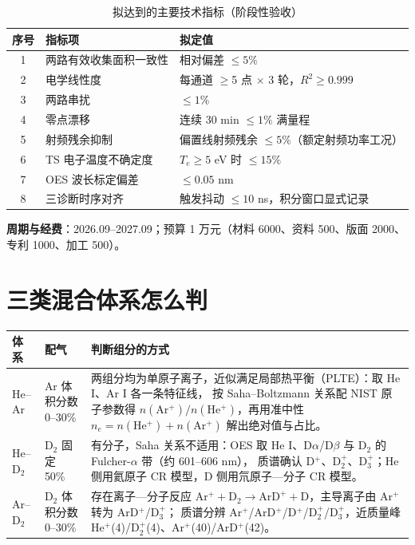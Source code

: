 \documentclass[11pt,a4paper]{ctexart}
\begin{document}
\begin{table}[h]
\centering\small
\caption{拟达到的主要技术指标（阶段性验收）}
\begin{tabular}{@{}cll@{}}
\toprule
序号 & 指标项 & 拟定值 \\
\midrule
1 & 两路有效收集面积一致性 & 相对偏差 $\le 5\%$ \\
2 & 电学线性度 & 每通道 $\ge$5 点 $\times$ 3 轮，$R^2\ge 0.999$ \\
3 & 两路串扰 & $\le 1\%$ \\
4 & 零点漂移 & 连续 30 min $\le 1\%$ 满量程 \\
5 & 射频残余抑制 & 偏置线射频残余 $\le 5\%$（额定射频功率工况） \\
6 & TS 电子温度不确定度 & $T_e\ge 5$ eV 时 $\le 15\%$ \\
7 & OES 波长标定偏差 & $\le 0.05$ nm \\
8 & 三诊断时序对齐 & 触发抖动 $\le 10$ ns，积分窗口显式记录 \\
\bottomrule
\end{tabular}
\end{table}

\textbf{周期与经费}：2026.09--2027.09；预算 1 万元（材料 6000、资料 500、版面 2000、专利 1000、加工 500）。

\section{三类混合体系怎么判}

\begin{table}[h]
\centering\small
\begin{tabular}{@{}>{\raggedright\arraybackslash}p{2.1cm}>{\raggedright\arraybackslash}p{3.2cm}>{\raggedright\arraybackslash}p{10.2cm}@{}}
\toprule
体系 & 配气 & 判断组分的方式 \\
\midrule
He--Ar & Ar 体积分数 0--30\% & 两组分均为单原子离子，近似满足局部热平衡（PLTE）：取 He I、Ar I 各一条特征线，
按 Saha--Boltzmann 关系配 NIST 原子参数得 $n(\mathrm{Ar^+})/n(\mathrm{He^+})$，再用准中性 $n_e=n(\mathrm{He^+})+n(\mathrm{Ar^+})$ 解出绝对值与占比。\\
He--D$_2$ & D$_2$ 固定 50\% & 有分子，Saha 关系不适用：OES 取 He I、D$\alpha$/D$\beta$ 与 D$_2$ 的 Fulcher-$\alpha$ 带（约 601--606 nm），
质谱确认 D$^+$、D$_2^+$、D$_3^+$；He 侧用氦原子 CR 模型，D 侧用氘原子—分子 CR 模型。\\
Ar--D$_2$ & D$_2$ 体积分数 0--30\% & 存在离子—分子反应 $\mathrm{Ar^+ + D_2 \to ArD^+ + D}$，主导离子由 Ar$^+$ 转为 ArD$^+$/D$_3^+$；
质谱分辨 Ar$^+$/ArD$^+$/D$^+$/D$_2^+$/D$_3^+$，近质量峰 He$^+$(4)/D$_2^+$(4)、Ar$^+$(40)/ArD$^+$(42)。\\
\bottomrule
\end{tabular}
\end{table}
\end{document}
